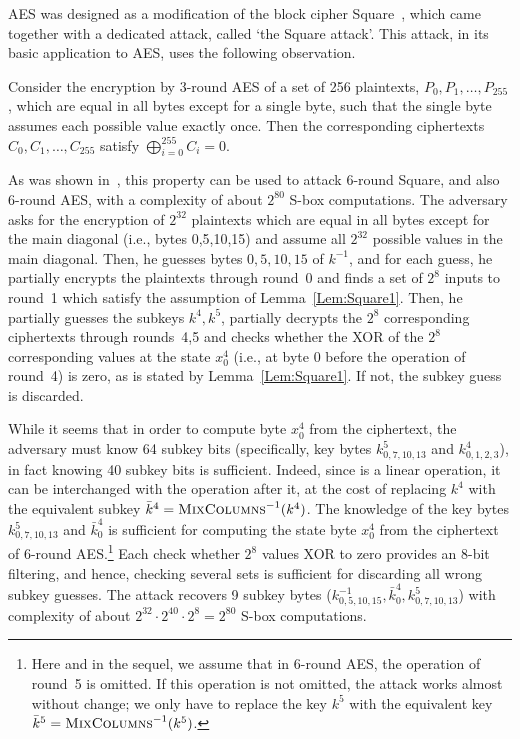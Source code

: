 AES was designed as a modification of the block cipher Square~\cite{FSE:DaemenKR97}, which came together with a dedicated attack, called `the Square attack'. This attack, in its basic application to AES, uses the following observation.
\begin{lemma}\label{Lem:Square1}
Consider the encryption by 3-round AES of a set of 256 plaintexts, $P_0,P_1,\ldots,P_{255}$, which are equal in all bytes except for a single byte, such that the single byte assumes each possible value exactly once. Then the corresponding ciphertexts $C_0,C_1,\ldots,C_{255}$ satisfy $\bigoplus_{i=0}^{255} C_i=0$.  
\end{lemma}
As was shown in~\cite{FSE:DaemenKR97}, this property can be used to attack 6-round Square, and also 6-round AES, with a complexity of about $2^{80}$ S-box computations. The adversary asks for the encryption of $2^{32}$ plaintexts which are equal in all bytes except for the main diagonal (i.e., bytes 0,5,10,15) and assume all $2^{32}$ possible values in the main diagonal. Then, he guesses bytes $0,5,10,15$ of $k^{-1}$, and for each guess, he partially encrypts the plaintexts through round~0 and finds a set of $2^8$ inputs to round~1 which satisfy the assumption of Lemma~\ref{Lem:Square1}. Then, he partially guesses the subkeys $k^4,k^5$, partially decrypts the $2^8$ corresponding ciphertexts through rounds~4,5 and checks whether the XOR of the $2^8$ corresponding values at the state $x^4_0$ (i.e., at byte 0 before the \subB operation of round~4) is zero, as is stated by Lemma~\ref{Lem:Square1}. If not, the subkey guess is discarded.

While it seems that in order to compute byte $x^4_0$ from the ciphertext, the adversary must know 64 subkey bits (specifically, key bytes $k^5_{0,7,10,13}$ and $k^4_{0,1,2,3}$), in fact knowing 40 subkey bits is sufficient. Indeed, since \mc is a linear operation, it can be interchanged with the \ak operation after it, at the cost of replacing $k^4$ with the equivalent subkey $\bar{k}^4=\textsc{MixColumns}^{-1}(k^4)$. The knowledge of the key bytes $k^5_{0,7,10,13}$ and $\bar{k}^4_0$ is sufficient for computing the state byte $x^4_0$ from the ciphertext of 6-round AES.\footnote{Here and in the sequel, we assume that in 6-round AES, the \mc operation of round~5 is omitted. If this operation is not omitted, the attack works almost without change; we only have to replace the key $k^5$ with the equivalent key $\bar{k}^5=\textsc{MixColumns}^{-1}(k^5)$.} Each check whether $2^8$ values XOR to zero provides an 8-bit filtering, and hence, checking several sets is sufficient for discarding all wrong subkey guesses. The attack recovers 9 subkey bytes ($k^{-1}_{0,5,10,15},\bar{k}^4_0,k^5_{0,7,10,13}$) with complexity of about $2^{32} \cdot 2^{40} \cdot 2^8=2^{80}$ S-box computations.

